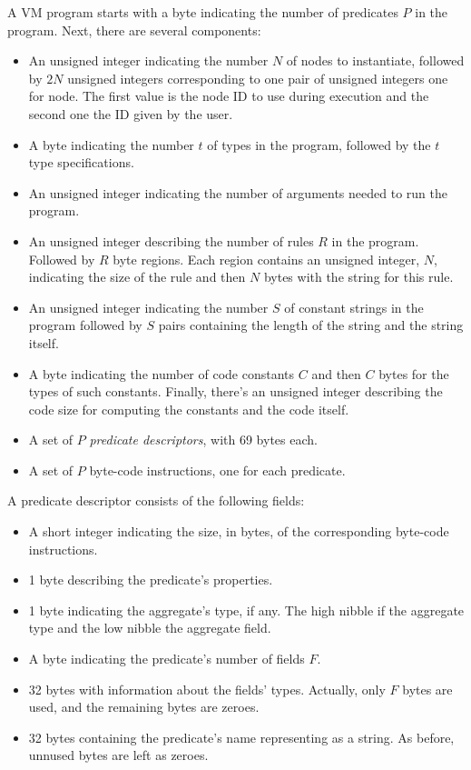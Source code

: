 \documentclass{article}
\begin{document}
\newcommand{\inst}[3]{#1&\byte#2\\\endbyte&{\it #3}\\}
\newcommand{\op}[2]{\ensuremath{#1}&\byte#2\\\endbyte}
\newcommand{\val}[3]{#1&\byte#2\\\endbyte&{\it #3}\\}


A VM program starts with a byte indicating the number of predicates $P$ in the
program. Next, there are several components:

\begin{itemize}
	\item An unsigned integer indicating the number $N$ of nodes to instantiate, followed by $2N$ unsigned integers corresponding to one pair of unsigned integers one for node. The first value is the node ID to use during execution and the second one the ID given by the user.
   \item A byte indicating the number $t$ of types in the program, followed by the $t$ type specifications.
   \item An unsigned integer indicating the number of arguments needed to run the program.
   \item An unsigned integer describing the number of rules $R$ in the program. Followed by $R$ byte regions. Each region contains an unsigned integer, $N$, indicating the size of the rule and then $N$ bytes with the string for this rule.
	\item An unsigned integer indicating the number $S$ of constant strings in the program followed by $S$ pairs containing the length of the string and the string itself.
	\item A byte indicating the number of code constants $C$ and then $C$ bytes for the types of such constants. Finally, there's an unsigned integer describing the code size for computing the constants and the code itself.
	\item A set of $P$ \emph{predicate descriptors}, with 69 bytes each.
	\item A set of $P$ byte-code instructions, one for each predicate.
\end{itemize}

A predicate descriptor consists of the following fields:
\begin{itemize}
	\item A short integer indicating the size, in bytes, of the corresponding byte-code instructions.
	\item 1 byte describing the predicate's properties.
	\item 1 byte indicating the aggregate's type, if any. The high nibble if the aggregate type and the low nibble the aggregate field.
	\item A byte indicating the predicate's number of fields $F$.
	\item 32 bytes with information about the fields' types. Actually, only $F$ bytes are used, and the remaining bytes are zeroes.
	\item 32 bytes containing the predicate's name representing as a string. As before, unnused bytes are left as zeroes.
\end{itemize}
\end{document}

